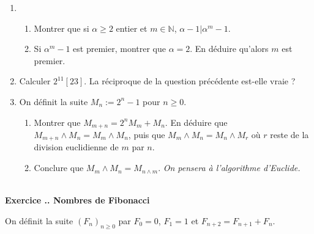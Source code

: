 \documentclass{article}
\newcommand{\mb}[1]{\mathbb{#1}}
\newcounter{exo}
\newcommand{\exercice}[1][\null]{\textbf{\\ Exercice \thesection.\theexo. #1} \addtocounter{exo}{1}}
\begin{document}
\begin{enumerate}

\item 

\begin{enumerate}

\item Montrer que si $\alpha \ge 2$ entier et $m \in \mb{N}$, $\alpha-1 | \alpha^m -1 $.

\item Si $\alpha^m -1$ est premier, montrer que $\alpha = 2$. En déduire qu'alors $m$ est premier.

\end{enumerate}

\item Calculer $2^{11} [23]$. La réciproque de la question précédente est-elle vraie ?

\item On définit la suite $M_n := 2^n -1$ pour $n \ge 0$.

\begin{enumerate}


\item Montrer que $M_{m+n} = 2^n M_{m} + M_n$. En déduire que $M_{m+n} \wedge M_n = M_{m} \wedge M_n$, puis que $M_m \wedge M_n = M_n \wedge M_r $ où $r$ reste de la division euclidienne de $m$ par $n$.

\item Conclure que $M_m \wedge M_n = M_{n \wedge m}$. \emph{On pensera à l'algorithme d'Euclide.}
\end{enumerate}

\end{enumerate}


\exercice[Nombres de Fibonacci]

On définit la suite $(F_n)_{n \ge 0}$ par $F_0 = 0 $, $F_1 =1$ et $F_{n+2} = F_{n+1} + F_n$.
\end{document}
